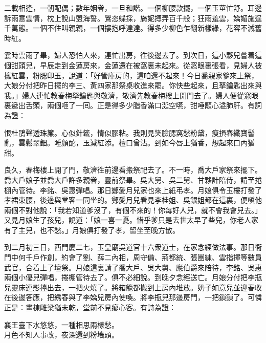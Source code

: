\begin{myquote}
二載相逢，一朝配偶；數年姻眷，一旦和諧。一個柳腰款擺，一個玉莖忙舒。耳邊訴雨意雲情，枕上說山盟海誓。鶯恣蝶採，旖妮搏弄百千般；狂雨羞雲，嬌媚施逞千萬態。一個不住叫親親，一個摟抱呼達達。得多少柳色乍翻新樣綠，花容不減舊時紅。
\end{myquote}

霎時雲雨了畢，婦人恐怕人來，連忙出房，徃後邊去了。到次日，這小夥兒嘗着這個甜頭兒，早辰走到金蓮房來，金蓮還在被窩裏未起來。從窓眼裏張看，見婦人被擁紅雲，粉腮印玉，說道：「好管庫房的，這咱還不起來！今日喬親家爹來上祭，大娘分付把昨日擺的李三、黃四家那祭桌收進來罷。你快些起來，且拏鑰匙出來與我。」婦人連忙教春梅拏鑰匙與敬濟，敬濟先教春梅樓上開門去了。婦人便從窓眼裏遞出舌頭，兩個咂了一囘。正是得多少脂香滿口涎空嚥，甜唾顒心溢肺肝。有詞為證：

\begin{myquote}
恨杜鵑聲透珠簾。心似針籤，情似膠粘。我則見笑臉腮窩愁粉黛，瘦損春纖寶髻亂，雲鬆翠鈿。睡顏酡，玉減紅添。檀口曾沾。到如今唇上猶香，想起來口內猶甜。
\end{myquote}

良久，春梅樓上開了門，敬濟徃前邊看搬祭祀去了。不一時，喬大戶家祭來擺下。喬大戶娘子並喬大戶許多親眷，靈前祭畢。吳大舅、吳二舅、甘夥計陪侍，請至捲棚內管待。李銘、吳惠彈唱。那日鄭愛月兒家也來上紙弔孝。月娘俱令玉樓打發了孝裙束腰，後邊與堂客一同坐的。鄭愛月兒看見李桂姐、吳銀姐都在這裏，便嗔他兩個不對他說：「我若知道爹沒了，有個不來的！你每好人兒，就不會我會兒去。」又見月娘生了孩兒，說道：「娘一喜一憂。惜乎爹只是去世太早了些兒，你老人家有了主兒，也不愁。」月娘俱打發了孝，留坐至晚方散。

到二月初三日，西門慶二七，玉皇廟吳道官十六衆道士，在家念經做法事。那日衙門中何千戶作創，約會了劉、薛二內相，周守備、荊都統、張團練、雲指揮等數員武官，合着上了壇祭。月娘這裏請了喬大戶、吳大舅、應伯爵來陪待，李銘、吳惠兩個小優兒彈唱，捲棚管待去了。俱不必細說。到晚夕念經送亡。月娘分付把李瓶兒靈床連影擡出去，一把火燒了。將箱籠都搬到上房內堆放。奶子如意兒並迎春收在後邊答應，把綉春與了李嬌兒房內使喚。將李瓶兒那邊房門，一把鎖鎖了。可憐正是：畫棟雕梁猶未乾，堂前不見癡心客。有詩為證：

\begin{myquote}
襄王臺下水悠悠，一種相思兩樣愁。\\月色不知人事改，夜深還到粉墻頭。
\end{myquote}

